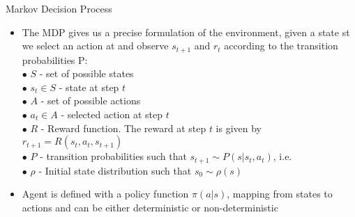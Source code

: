 \begin{frame}{Markov Decision Process}
    \begin{itemize}
        
        \item The MDP gives us a precise formulation of the environment, given a state st we select an action at and observe $s_{t+1}$ and $r_{t}$ according to the transition probabilities P:\\
        \bigskip
        \hspace{0.5cm}$\bullet$  $S$ - set of possible states \\
        \hspace{0.5cm}$\bullet$  $s_{t}\in S$ - state at step $t$ \\
        \hspace{0.5cm}$\bullet$  $A$ - set of possible actions \\
        \hspace{0.5cm}$\bullet$  $a_{t}\in A$ - selected action at step $t$\\
        \hspace{0.5cm}$\bullet$  $R$ - Reward function. The reward at step $t$ is given by $r_{t+1} = R(s_{t}, a_{t}, s_{t+1})$\\
        \hspace{0.5cm}$\bullet$ $P$ - transition probabilities such that $s_{t+1} \sim P(s|s_{t},a_{t})$, i.e. \\
        \hspace{0.5cm}$\bullet$  $\rho$ - Initial state distribution such that $s_{0} \sim \rho(s)$\\
        \bigskip
        \item Agent is defined with a policy function $\pi(a|s)$, mapping from states to actions and can be either deterministic or non-deterministic
        
    \end{itemize}
\end{frame}

